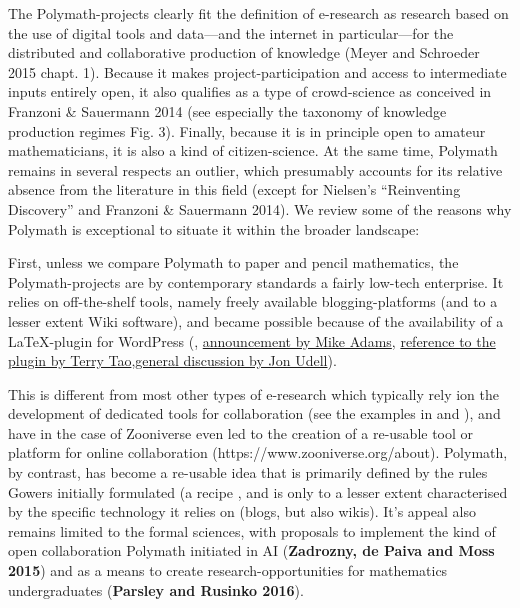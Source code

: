 \documentclass[article, floatfix, groupaddress, prb]{revtex4-1}
\begin{document}
The Polymath-projects clearly fit the definition of e-research as
research based on the use of digital tools and data---and the internet
in particular---for the distributed and collaborative production of
knowledge (Meyer and Schroeder 2015 chapt. 1). Because it makes
project-participation and access to intermediate inputs entirely open,
it also qualifies as a type of crowd-science as conceived in Franzoni \&
Sauermann 2014 (see especially the taxonomy of knowledge production
regimes Fig. 3). Finally, because it is in principle open to amateur
mathematicians, it is also a kind of citizen-science. At the same time,
Polymath remains in several respects an outlier, which presumably
accounts for its relative absence from the literature in this field
(except for Nielsen's ``Reinventing Discovery'' and Franzoni \&
Sauermann 2014). We review some of the reasons why Polymath is
exceptional to situate it within the broader landscape:

First, unless we compare Polymath to paper and pencil mathematics, the
Polymath-projects are by contemporary standards a fairly low-tech
enterprise. It relies on off-the-shelf tools, namely freely available
blogging-platforms (and to a lesser extent Wiki software), and became
possible because of the availability of a LaTeX-plugin for WordPress
(\cite{Gowers:AnIrregularMind:2010},
\href{https://en.blog.wordpress.com/2007/02/17/math-for-the-masses/}{announcement
by Mike Adams},
\href{https://terrytao.wordpress.com/2009/07/22/imo-2009-q6-mini-polymath-project-impressions-reflections-analysis/}{reference
to the plugin by Terry
Tao},\href{https://blog.jonudell.net/2009/07/31/polymath-equals-user-innovatio/}{general
discussion by Jon Udell}).

This is different from most other types of e-research which typically
rely ion the development of dedicated tools for collaboration (see the
examples in \cite{Nielsen:ReinventingDiscoveryTheNewEraOf:2012} and
\cite{meyer2015knowledge}), and have in the case of Zooniverse even led
to the creation of a re-usable tool or platform for online collaboration
(https://www.zooniverse.org/about). Polymath, by contrast, has become a
re-usable idea that is primarily defined by the rules Gowers initially
formulated (a recipe , and is only to a lesser extent characterised by
the specific technology it relies on (blogs, but also wikis). It's
appeal also remains limited to the formal sciences, with proposals to
implement the kind of open collaboration Polymath initiated in AI
(\textbf{Zadrozny, de Paiva and Moss 2015}) and as a means to create
research-opportunities for mathematics undergraduates (\textbf{Parsley
and Rusinko 2016}).
\end{document}
